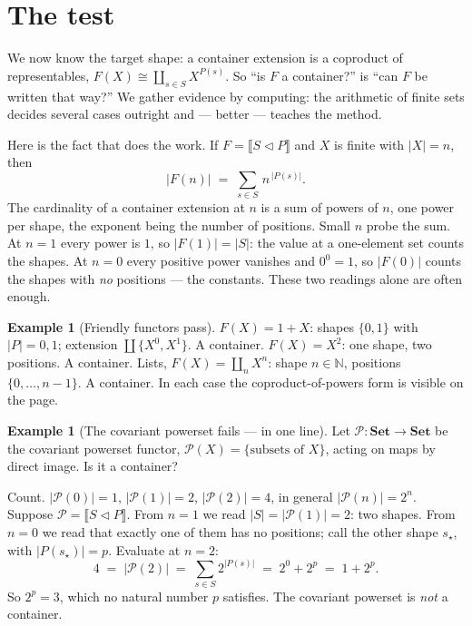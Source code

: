 \documentclass[11pt,a4paper]{book}
\newcommand{\Set}{\mathbf{Set}}
\newcommand{\cont}[2]{#1 \triangleleft #2}
\newcommand{\Ext}[1]{\llbracket #1 \rrbracket}
\theoremstyle{plain}
\theoremstyle{definition}
\newtheorem{Example}[Theorem]{Example}
\theoremstyle{remark}
\begin{document}
\section{The test}
\label{sec:test}

We now know the target shape: a container extension is a coproduct of
representables, $F(X)\cong\coprod_{s\in S}X^{P(s)}$. So ``is $F$ a container?'' is
``can $F$ be written that way?'' We gather evidence by computing: the arithmetic of
finite sets decides several cases outright and --- better --- teaches the method.

Here is the fact that does the work. If $F=\Ext{\cont SP}$ and $X$ is finite with
$|X|=n$, then
\[
  |F(n)| \;=\; \sum_{s\in S}\, n^{\,|P(s)|}.
\]
The cardinality of a container extension at $n$ is a sum of powers of $n$, one power
per shape, the exponent being the number of positions. Small $n$ probe the sum. At
$n=1$ every power is $1$, so $|F(1)|=|S|$: the value at a one-element set counts the
shapes. At $n=0$ every positive power vanishes and $0^0=1$, so $|F(0)|$ counts the
shapes with \emph{no} positions --- the constants. These two readings alone are
often enough.

\begin{Example}[Friendly functors pass]\label{ex:pass}
$F(X)=1+X$: shapes $\{0,1\}$ with $|P|=0,1$; extension $\coprod\{X^0,X^1\}$. A
container. $F(X)=X^2$: one shape, two positions. A container. Lists,
$F(X)=\coprod_n X^n$: shape $n\in\mathbb N$, positions $\{0,\dots,n-1\}$. A
container. In each case the coproduct-of-powers form is visible on the page.
\end{Example}

\begin{Example}[The covariant powerset fails --- in one line]\label{ex:powerset}
Let $\mathcal P\colon\Set\to\Set$ be the covariant powerset functor, $\mathcal
P(X)=\{\text{subsets of }X\}$, acting on maps by direct image. Is it a container?

Count. $|\mathcal P(0)|=1$, $|\mathcal P(1)|=2$, $|\mathcal P(2)|=4$, in general
$|\mathcal P(n)|=2^n$. Suppose $\mathcal P=\Ext{\cont SP}$. From $n=1$ we read
$|S|=|\mathcal P(1)|=2$: two shapes. From $n=0$ we read that exactly one of them has
no positions; call the other shape $s_\star$, with $|P(s_\star)|=p$. Evaluate at
$n=2$:
\[
  4 \;=\; |\mathcal P(2)| \;=\; \sum_{s\in S} 2^{|P(s)|}
        \;=\; 2^{0}+2^{p} \;=\; 1+2^{p}.
\]
So $2^p=3$, which no natural number $p$ satisfies. The covariant powerset is
\emph{not} a container.
\end{Example}
\end{document}

